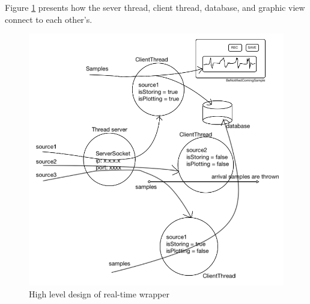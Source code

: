 Figure \ref{fig:Figures/ThreadsDBPlot} presents how the sever thread, client thread, database, and graphic view connect to each other’s.
\begin{figure}[ht]
    \centering
    \includegraphics[width=1.0\textwidth]{Figures/ThreadsDBPlot.png}
    \caption{High level design of real-time wrapper}
    \label{fig:Figures/ThreadsDBPlot}
\end{figure}
